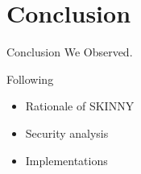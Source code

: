 \section{Conclusion}

\begin{frame}{Conclusion}
	We Observed.
	\begin{block}{Following}
		\begin{itemize}[<+->]
\item	Rationale of SKINNY
\item Security analysis
\item Implementations
		\end{itemize}
	\end{block}
\end{frame}